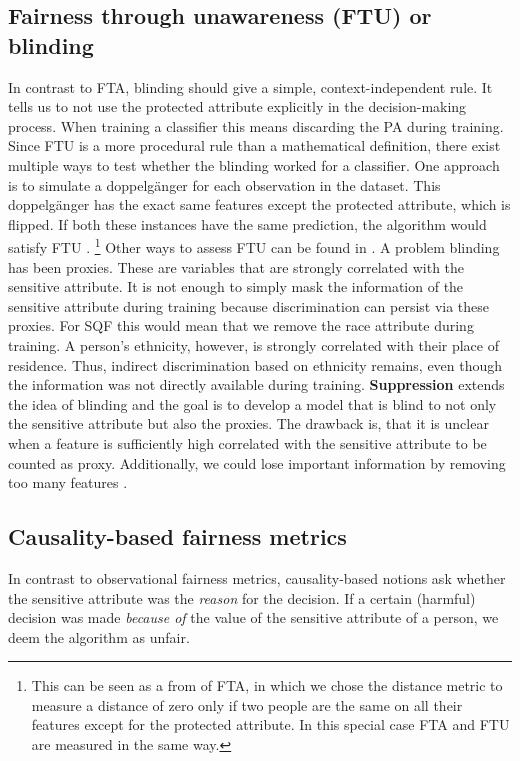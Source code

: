 \subsection*{Fairness through unawareness (FTU) or blinding}
In contrast to FTA, blinding should give a simple, context-independent rule. It tells us to not use the protected attribute explicitly in the decision-making process. When training a classifier this means discarding the PA during training.
Since FTU is a more procedural rule than a mathematical definition, there exist multiple ways to test whether the blinding worked for a classifier. One approach is to simulate a doppelgänger for each observation in the dataset. This doppelgänger has the exact same features except the protected attribute, which is flipped.
If both these instances have the same prediction, the algorithm would satisfy FTU \cite{verma2018}. \footnote{This can be seen as a from of FTA, in which we chose the distance metric to measure a distance of zero only if two people are the same on all their features except for the protected attribute. In this special case FTA and FTU are measured in the same way.} Other ways to assess FTU can be found in \cite{verma2018}. 
A problem blinding has been proxies. These are variables that are strongly correlated with the sensitive attribute. It is not enough to simply mask the information of the sensitive attribute during training because discrimination can persist via these proxies.
For SQF this would mean that we remove the race attribute during training.
A person's ethnicity, however, is strongly correlated with their place of residence. Thus, indirect discrimination based on ethnicity remains, even though the information was not directly available during training. \textbf{Suppression} extends the idea of blinding and the goal is to develop a model that is blind to not only the sensitive attribute but also the proxies. The drawback is, that it is unclear when a feature is sufficiently high correlated with the sensitive attribute to be counted as proxy. Additionally, we could lose important information by removing too many features \cite{castelnovo2022}.

\subsection{Causality-based fairness metrics}
In contrast to observational fairness metrics, causality-based notions ask whether the sensitive attribute was the \textit{reason} for the decision. If a certain (harmful) decision was made \textit{because of} the value of the sensitive attribute of a person, we deem the algorithm as unfair.

